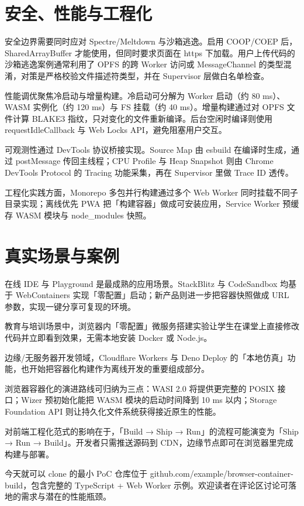 \chapter{安全、性能与工程化}
安全边界需要同时应对 Spectre/Meltdown 与沙箱逃逸。启用 COOP/COEP 后，SharedArrayBuffer 才能使用，但同时要求页面在 https 下加载。用户上传代码的沙箱逃逸案例通常利用了 OPFS 的跨 Worker 访问或 MessageChannel 的类型混淆，对策是严格校验文件描述符类型，并在 Supervisor 层做白名单检查。\par
性能调优聚焦冷启动与增量构建。冷启动可分解为 Worker 启动（约 80 ms）、WASM 实例化（约 120 ms）与 FS 挂载（约 40 ms）。增量构建通过对 OPFS 文件计算 BLAKE3 指纹，只对变化的文件重新编译。后台空闲时编译则使用 requestIdleCallback 与 Web Locks API，避免阻塞用户交互。\par
可观测性通过 DevTools 协议桥接实现。Source Map 由 esbuild 在编译时生成，通过 postMessage 传回主线程；CPU Profile 与 Heap Snapshot 则由 Chrome DevTools Protocol 的 Tracing 功能采集，再在 Supervisor 里做 Trace ID 透传。\par
工程化实践方面，Monorepo 多包并行构建通过多个 Web Worker 同时挂载不同子目录实现；离线优先 PWA 把「构建容器」做成可安装应用，Service Worker 预缓存 WASM 模块与 node\_{}modules 快照。\par
\chapter{真实场景与案例}
在线 IDE 与 Playground 是最成熟的应用场景。StackBlitz 与 CodeSandbox 均基于 WebContainers 实现「零配置」启动；新产品则进一步把容器快照做成 URL 参数，实现一键分享可复现的环境。\par
教育与培训场景中，浏览器内「零配置」微服务搭建实验让学生在课堂上直接修改代码并立即看到效果，无需本地安装 Docker 或 Node.js。\par
边缘/无服务器开发领域，Cloudflare Workers 与 Deno Deploy 的「本地仿真」功能，也开始把容器化构建作为离线开发的重要组成部分。\par
浏览器容器化的演进路线可归纳为三点：WASI 2.0 将提供更完整的 POSIX 接口；Wizer 预初始化能把 WASM 模块的启动时间降到 10 ms 以内；Storage Foundation API 则让持久化文件系统获得接近原生的性能。\par
对前端工程化范式的影响在于，「Build → Ship → Run」的流程可能演变为「Ship → Run → Build」。开发者只需推送源码到 CDN，边缘节点即可在浏览器里完成构建与部署。\par
今天就可以 clone 的最小 PoC 仓库位于 github.com/example/browser-container-build，包含完整的 TypeScript + Web Worker 示例。欢迎读者在评论区讨论可落地的需求与潜在的性能瓶颈。\par
